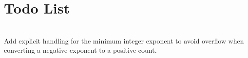 \chapter{Todo List }
\hypertarget{todo}{}\label{todo}

\begin{DoxyRefList}
\item[{\parbox[t]{\linewidth}{Member \doxylink{class_calculation_engine_a19d4dd01a764735328b503a531be8ce0}{Calculation\+Engine::power} (double base, int exponent) const}}]\hfill \\
\label{todo__todo000001}%
%
Add explicit handling for the minimum integer exponent to avoid overflow when converting a negative exponent to a positive count. 
\end{DoxyRefList}